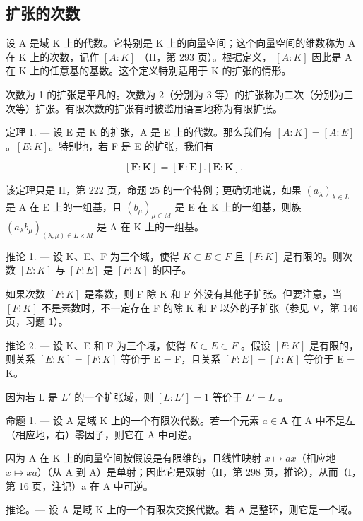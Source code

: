\subsection{扩张的次数}

设 A 是域 K 上的代数。它特别是 K 上的向量空间；这个向量空间的维数称为 A 在 K 上的次数，记作 \([A:K]\) （II，第 293 页）。根据定义， \([A:K]\) 因此是 A 在 K 上的任意基的基数。这个定义特别适用于 K 的扩张的情形。

次数为 1 的扩张是平凡的。次数为 2（分别为 3 等）的扩张称为二次（分别为三次等）扩张。有限次数的扩张有时被滥用语言地称为有限扩张。

定理 1. --- 设 E 是 K 的扩张，A 是 E 上的代数。那么我们有 \([A:K]=[A:E]\)。\([E:K]\)。特别地，若 F 是 E 的扩张，我们有

\[
[ \mathbf {F}: \mathbf {K} ] = [ \mathbf {F}: \mathbf {E} ]. [ \mathbf {E}: \mathbf {K} ].\tag{1}
\]

该定理只是 II，第 222 页，命题 25 的一个特例；更确切地说，如果 \((a_{\lambda})_{\lambda \in L}\) 是 A 在 E 上的一组基，且 \((b_{\mu})_{\mu \in M}\) 是 E 在 K 上的一组基，则族 \((a_{\lambda}b_{\mu})_{(\lambda ,\mu)\in L\times M}\) 是 A 在 K 上的一组基。

推论 1. --- 设 K、E、F 为三个域，使得 \(K \subset E \subset F\) 且 \([F:K]\) 是有限的。则次数 \([E:K]\) 与 \([F:E]\) 是 \([F:K]\) 的因子。

如果次数 \([F:K]\) 是素数，则 F 除 K 和 F 外没有其他子扩张。但要注意，当 \([F:K]\) 不是素数时，不一定存在 F 的除 K 和 F 以外的子扩张（参见 V，第 146 页，习题 1）。

推论 2. --- 设 K、E 和 F 为三个域，使得 \(K \subset E \subset F\) 。假设 \([F:K]\) 是有限的，则关系 \([E:K] = [F:K]\) 等价于 E = F，且关系 \([F:E] = [F:K]\) 等价于 E = K。

因为若 L 是 \(L'\) 的一个扩张域，则 \([L:L'] = 1\) 等价于 \(L' = L\) 。

命题 1. --- 设 A 是域 K 上的一个有限次代数。若一个元素 \(a \in \mathbf{A}\) 在 A 中不是左（相应地，右）零因子，则它在 A 中可逆。

因为 A 在 K 上的向量空间按假设是有限维的，且线性映射 \(x \mapsto ax\)（相应地 \(x \mapsto xa\)）（从 A 到 A）是单射；因此它是双射（II，第 298 页，推论），从而（I，第 16 页，注记）a 在 A 中可逆。

推论。--- 设 A 是域 K 上的一个有限次交换代数。若 A 是整环，则它是一个域。

